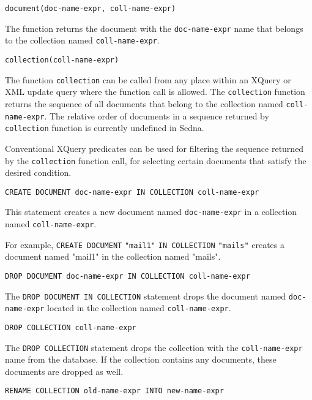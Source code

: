\documentclass[a4paper,12pt]{article}
\begin{document}
\begin{verbatim}document(doc-name-expr, coll-name-expr)\end{verbatim}

The function returns the document with
the \verb!doc-name-expr! name that belongs to the collection named \verb!coll-name-expr!.

\begin{verbatim}collection(coll-name-expr)\end{verbatim}

The function \verb!collection! can be called from any place within an XQuery or
XML update query where the function call is allowed.
The \verb!collection! function returns the sequence of all documents that
belong to the collection named \verb!coll-name-expr!.
The relative order of documents in a sequence returned by \verb!collection!
function is currently undefined in Sedna.

Conventional XQuery predicates can be used for filtering the sequence returned
by the \verb!collection! function call, for selecting certain documents that
satisfy the desired condition.

\begin{verbatim}
CREATE DOCUMENT doc-name-expr IN COLLECTION coll-name-expr
\end{verbatim}

This statement creates a new document named \verb!doc-name-expr! in a collection named \verb!coll-name-expr!.

For example, \verb!CREATE DOCUMENT! \verb!"mail1"! \verb!IN COLLECTION! \verb!"mails"! creates a document named "mail1" in the collection named "mails".

\begin{verbatim}DROP DOCUMENT doc-name-expr IN COLLECTION coll-name-expr\end{verbatim}

The \verb!DROP DOCUMENT IN COLLECTION! statement drops the document named
\verb!doc-name-expr! located in the collection named \verb!coll-name-expr!.

\begin{verbatim}DROP COLLECTION coll-name-expr\end{verbatim}

The \verb!DROP COLLECTION! statement drops the collection with the
\verb!coll-name-expr! name from the database.
If the collection contains any documents, these documents are dropped as well.

\begin{verbatim}
RENAME COLLECTION old-name-expr INTO new-name-expr
\end{verbatim}
\end{document}
